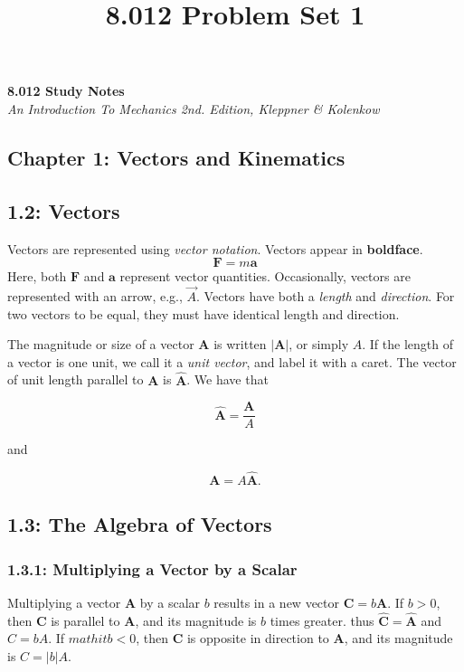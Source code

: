 \documentclass[12pt,twoside]{article}
\title{8.012 Problem Set 1}
\begin{document}
\delimitershortfall=-1pt

\centering
\textbf{8.012 Study Notes} \\ \vspace{5mm}
\textit{An Introduction To Mechanics 2nd. Edition, Kleppner \& Kolenkow}
\setlength{\parindent}{0pt}

\medskip

\hrulefill

\begin{flushleft}
\section*{Chapter 1: Vectors and Kinematics}
\subsection*{1.2: Vectors}

Vectors are represented using \textit{vector notation}. Vectors appear in \textbf{boldface}.
$$
\mathbf{F} = m\mathbf{a}
$$
Here, both $\mathbf{F}$ and $\mathbf{a}$ represent vector quantities. Occasionally, vectors are represented with an arrow, e.g., $\overrightarrow{A}$.
Vectors have both a \textit{length} and \textit{direction}. For two vectors to be equal, they must have identical length and direction.

The magnitude or size of a vector $\mathbf{A}$ is written $\left|\mathbf{A}\right|$, or simply $\mathit{A}$. If the length of a vector is one unit, we
call it a \textit{unit vector}, and label it with a caret. The vector of unit length parallel to $\mathbf{A}$ is $\mathbf{\hat{A}}$. We have that

$$
\mathbf{\hat{A}} = \frac{\mathbf{A}}{\mathit{A}}
$$

and

$$
\mathbf{A} = \mathit{A}\mathbf{\hat{A}}.
$$

\subsection*{1.3: The Algebra of Vectors}

\subsubsection*{1.3.1: Multiplying a Vector by a Scalar}

Multiplying a vector $\mathbf{A}$ by a scalar $\mathit{b}$ results in a new vector $\mathbf{C} = \mathit{b}\mathbf{A}$. If $\mathit{b} > 0$, then
$\mathbf{C}$ is parallel to $\mathbf{A}$, and its magnitude is $\mathit{b}$ times greater. thus $\mathbf{\hat{C}} = \mathbf{\hat{A}}$ and
$\mathit{C} = \mathit{b}\mathit{A}$. If $mathit{b} < 0$, then $\mathbf{C}$ is opposite in direction to $\mathbf{A}$, and its magnitude is
$\mathit{C} = \left|\mathit{b}\right|\mathit{A}$.


\end{flushleft}
\end{document}
